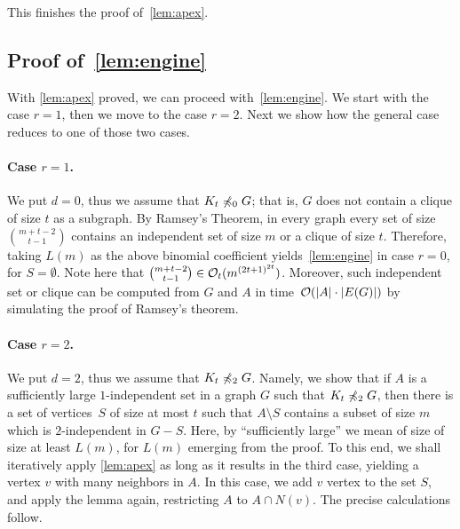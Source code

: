 This finishes the proof of~\cref{lem:apex}.

\subsection{Proof of~\cref{lem:engine}}
\label{sec:engine}

With \cref{lem:apex} proved, we can proceed with~\cref{lem:engine}. 
We start with the case $r=1$, then we move to the case $r=2$. 
Next we show how the general case reduces to one of those two cases.

\paragraph{Case $r=1$.}
We put $d=0$, thus we assume that $K_t\not\preccurlyeq_0 G$; that is, $G$ does not contain a clique of size $t$ as a subgraph. By Ramsey's Theorem, in every graph every set of size $\binom{m+t-2}{t-1}$ contains an
independent set of size $m$ or a clique of size $t$. Therefore, 
taking $L(m)$ as the above binomial coefficient yields~\cref{lem:engine} in case $r=0$, for $S=\emptyset$. Note here that $\binom{m+t-2}{t-1}\in\mathcal{O}_{t}{(m^{{(2t+1)}^{2t}})}$.
Moreover, such independent set or clique can be computed from $G$ and $A$ in time~$\mathcal{O}(|A|\cdot |E(G)|)$ by simulating the proof of Ramsey's theorem.

\paragraph{Case $r=2$.}
We put $d=2$, thus we assume that $K_t\not\preccurlyeq_2 G$.
Namely, we show that if $A$ is a sufficiently large $1$-independent set in a graph $G$ such that $K_t\not\preccurlyeq_2 G$, 
then there is a set of vertices~$S$ of size at most $t$ such that $A\setminus S$ contains a subset of size $m$ which is $2$-independent in $G-S$. 
Here, by ``sufficiently large'' we mean of size of size at least $L(m)$, for $L(m)$ emerging from the proof.
To this end, we shall iteratively apply \cref{lem:apex} as long as  it results in the third case, 
yielding a vertex $v$ with many neighbors in $A$. In this case, we add $v$ vertex to the set $S$, and apply the lemma again,
restricting $A$ to $A\cap N(v)$. 
The precise calculations follow.

